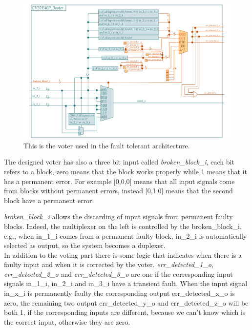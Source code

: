{{{            
    	    
    	    \begin{figure}[H]
        		\centering
        		\includegraphics[width=1.1\textwidth,center]{./images/cv32e40p_3voter.png}
        		\caption{This is the voter used in the fault tolerant architecture.}
        		\label{fig:cv32e40p_voter}
        	\end{figure} 	
        	
        	The designed voter has also a three bit input called \textit{broken\_block\_i}, each bit refers to a block, zero means that the block works properly while 1 means that it has a permanent error.
            For example [0,0,0] means that all input signals come from blocks without permanent errors, instead [0,1,0] means that the second block have a permanent error.
            
            \textit{broken\_block\_i} allows the discarding of input signals from permanent faulty blocks.
            Indeed, the multiplexer on the left is controlled by the broken\_block\_i, e.g., when in\_1\_i comes from a permanent faulty block, in\_2\_i is automatically selected as output, so the system becomes a duplexer.\\
            
            In addition to the voting part there is some logic that indicates when there is a faulty input and when it is corrected by the voter.
            \textit{err\_detected\_1\_o}, \textit{err\_detected\_2\_o} and \textit{err\_detected\_3\_o} are one if the corresponding input signals in\_1\_i, in\_2\_i and in\_3\_i have a transient fault. When the input signal in\_x\_i is permanently faulty the corresponding output  err\_detected\_x\_o is zero, the remaining two output err\_detected\_y\_o and err\_detected\_z\_o will be both 1, if the corresponding inputs are different, because we can't know which is the correct input, otherwise they are zero.
            
}}}
